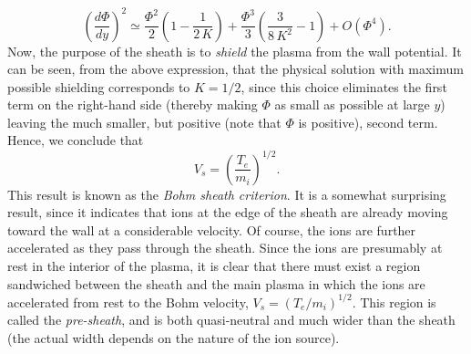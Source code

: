 \begin{equation}
\left(\frac{d\Phi}{dy}\right)^2 \simeq \frac{\Phi^2}{2}\left(1- \frac{1}{2\,K}\right) + \frac{\Phi^3}{3}\left(\frac{3}{8\,K^2}-1\right) + O(\Phi^4).
\end{equation}
Now, the purpose of the sheath is to {\em shield}\/ the plasma from the wall
potential. It can be seen, from the above expression, that the physical
solution with
maximum possible shielding corresponds to $K=1/2$, since this
choice eliminates the first term on the right-hand side (thereby making
$\Phi$ as small as possible at large $y$) leaving the much smaller,
but positive (note that $\Phi$ is positive), second term.
Hence, we conclude that
\begin{equation}\label{e3.273}
V_s = \left(\frac{T_e}{m_i}\right)^{1/2}.
\end{equation}
This result is known as the {\em Bohm sheath criterion}.
It is a somewhat surprising result, since it indicates that
ions at the edge of the sheath are already moving toward the wall at a
considerable velocity. Of course, the ions are further accelerated 
as they pass through the sheath. Since the ions are presumably at
rest in the interior of the plasma, it is clear that there
must exist a region sandwiched between the sheath and the main plasma
in which the ions are accelerated from rest to the Bohm velocity,
$V_s=(T_e/m_i)^{1/2}$. This region is called the {\em pre-sheath}, 
and  is both quasi-neutral and much wider than the sheath (the actual
width depends on the nature of the ion source).

